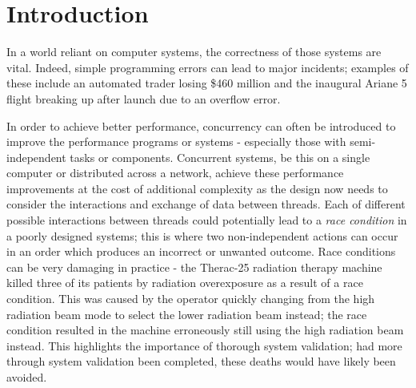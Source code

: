 \section{Introduction}


In a world reliant on computer systems, the correctness of those systems are vital. Indeed, simple programming errors can lead to major incidents; examples of these include an automated trader losing \$460 million\cite{KnightCapital} and the inaugural Ariane 5 flight breaking up after launch due to an overflow error\cite{Flight501Failure}. 

In order to achieve better performance, concurrency can often be introduced to improve the performance programs or systems - especially those with semi-independent tasks or components.
Concurrent systems, be this on a single computer or distributed across a network, achieve these performance improvements at the cost of additional complexity as the design now needs to consider the interactions and exchange of data between threads. 
Each of different possible interactions between threads could potentially lead to a \emph{race condition} in a poorly designed systems; this is where two non-independent actions can occur in an order which produces an incorrect or unwanted outcome. 
Race conditions can be very damaging in practice - the Therac-25 radiation therapy machine killed three of its patients by radiation overexposure as a result of a race condition\cite{BugSnag}. This was caused by the operator quickly changing from the high radiation beam mode to select the lower radiation beam instead; the race condition resulted in the machine erroneously still using the high radiation beam instead. This highlights the importance of thorough system validation; had more through system validation been completed, these deaths would have likely been avoided\cite{AGift}.



